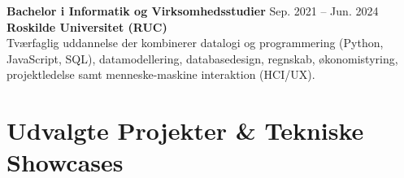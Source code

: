 \documentclass[9.5pt,a4paper]{article}
\begin{document}
\vspace{3pt}

\textbf{\fontsize{9.5}{12}\selectfont Bachelor i Informatik og Virksomhedsstudier} \hfill {\fontsize{8.5}{11}\selectfont\color{mutedgray}Sep. 2021 -- Jun. 2024} \\
{\fontsize{8.5}{11}\selectfont\textbf{\color{accent}Roskilde Universitet (RUC)}} \\[2pt]
{\fontsize{8.5}{11}\selectfont\color{darkslate}
Tværfaglig uddannelse der kombinerer datalogi og programmering (Python, JavaScript, SQL), datamodellering, databasedesign, regnskab, økonomistyring, projektledelse samt menneske-maskine interaktion (HCI/UX).
}

\section{Udvalgte Projekter \& Tekniske Showcases}
\end{document}
